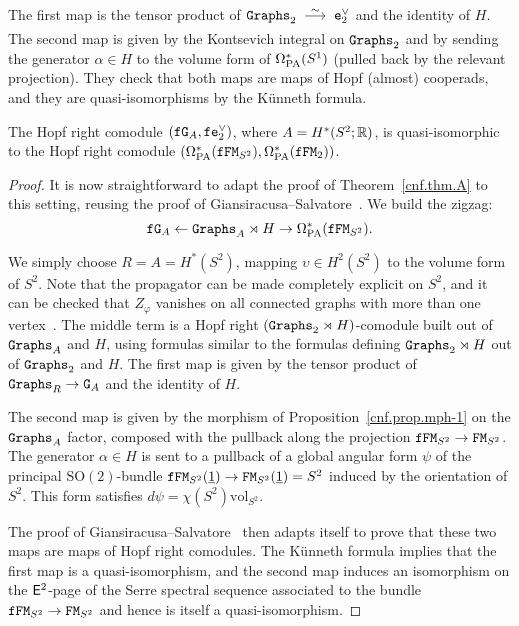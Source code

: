 The first map is the tensor product of $\Graphs_{2} \qiso \enV[2]$ and the identity of $H$.
The second map is given by the Kontsevich integral on $\Graphs_{2}$ and by sending the generator $\alpha \in H$ to the volume form of $\OmPA^{*}(S^{1})$ (pulled back by the relevant projection).
They check that both maps are maps of Hopf (almost) cooperads, and they are quasi-isomorphisms by the Künneth formula.

\begin{theorem}
  \label{cnf.thm.framed}
  The Hopf right comodule $(\ff\GG{A}, \ff\enV[2])$, where $A = H^{*}(S^{2}; \R)$, is quasi-isomorphic to the Hopf right comodule $(\OmPA^{*}(\ff\FM_{S^2}), \OmPA^{*}(\ff\FM_{2}))$.
\end{theorem}
\begin{proof}
  It is now straightforward to adapt the proof of Theorem~\ref{cnf.thm.A} to this setting, reusing the proof of Giansiracusa--Salvatore~\cite{GiansiracusaSalvatore2010}.
  We build the zigzag:
  \[ \ff\GG{A} \gets \Graphs_{A} \rtimes H \to \OmPA^{*}(\ff\FM_{S^2}). \]

  We simply choose $R = A = H^{*}(S^{2})$, mapping $\upsilon \in H^{2}(S^{2})$ to the volume form of $S^{2}$.
  Note that the propagator can be made completely explicit on $S^{2}$, and it can be checked that $Z_{\varphi}$ vanishes on all connected graphs with more than one vertex~\cite[Proposition 80]{CamposWillwacher2016}.
  The middle term is a Hopf right $(\Graphs_{2} \rtimes H)$-comodule built out of $\Graphs_{A}$ and $H$, using formulas similar to the formulas defining $\Graphs_{2} \rtimes H$ out of $\Graphs_{2}$ and $H$.
  The first map is given by the tensor product of $\Graphs_{R} \to \GG{A}$ and the identity of $H$.

  The second map is given by the morphism of Proposition~\ref{cnf.prop.mph-1} on the $\Graphs_{A}$ factor, composed with the pullback along the projection $\ff\FM_{S^2} \to \FM_{S^2}$.
  The generator $\alpha \in H$ is sent to a pullback of a global angular form $\psi$ of the principal $\mathrm{SO}(2)$-bundle $\ff\FM_{S^{2}}(\underline{1}) \to \FM_{S^{2}}(\underline{1}) = S^2$ induced by the orientation of $S^2$.
  This form satisfies $d\psi = \chi(S^2) \mathrm{vol}_{S^2}$.

  The proof of Giansiracusa--Salvatore~\cite{GiansiracusaSalvatore2010} then adapts itself to prove that these two maps are maps of Hopf right comodules.
  The Künneth formula implies that the first map is a quasi-isomorphism, and the second map induces an isomorphism on the $\EE^{2}$-page of the Serre spectral sequence associated to the bundle $\ff\FM_{S^2} \to \FM_{S^2}$ and hence is itself a quasi-isomorphism.
\end{proof}

